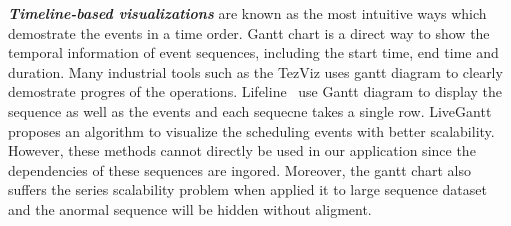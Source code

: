 \emph{\textbf{Timeline-based visualizations}} are known as the most intuitive ways which demostrate the events in a time order. Gantt chart is a direct way to show the temporal information of event sequences, including the start time, end time and duration. Many industrial tools such as the TezViz uses gantt diagram to clearly demostrate progres of the operations. Lifeline~\cite{plaisant1996lifelines} use Gantt diagram to display the sequence as well as the events and each sequecne takes a single row. LiveGantt~\cite{jo2014livegantt} proposes an algorithm to visualize the scheduling events with better scalability. However, these methods cannot directly be used in our application since the dependencies of these sequences are ingored. Moreover, the gantt chart also suffers the series scalability problem when applied it to large sequence dataset and the anormal sequence will be hidden without aligment.

